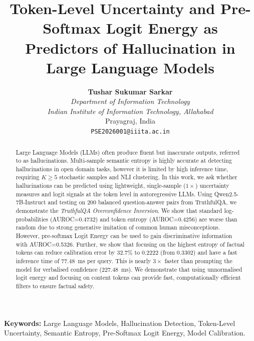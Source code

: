 \documentclass[10pt,twocolumn]{article}
\begin{document}
\title{\textbf{Token-Level Uncertainty and Pre-Softmax Logit Energy as Predictors of Hallucination in Large Language Models}}

\author{\textbf{Tushar Sukumar Sarkar} \\
\textit{Department of Information Technology} \\
\textit{Indian Institute of Information Technology, Allahabad}\\
Prayagraj, India \\
\texttt{PSE2026001@iiita.ac.in}}

\date{}
\maketitle

\begin{abstract}
Large Language Models (LLMs) often produce fluent but inaccurate outputs, referred to as hallucinations. Multi-sample semantic entropy is highly accurate at detecting hallucinations in open domain tasks, however it is limited by high inference time, requiring $K \geq 5$ stochastic samples and NLI clustering. In this work, we ask whether hallucinations can be predicted using lightweight, single-sample ($1\times$) uncertainty measures and logit signals at the token level in autoregressive LLMs. Using Qwen2.5-7B-Instruct and testing on 200 balanced question-answer pairs from TruthfulQA, we demonstrate the \textit{TruthfulQA Overconfidence Inversion}. We show that standard log-probabilities (AUROC=0.4732) and token entropy (AUROC=0.4256) are worse than random due to strong generative imitation of common human misconceptions. However, pre-softmax Logit Energy can be used to gain discriminative information with AUROC=0.5326. Further, we show that focusing on the highest entropy of factual tokens can reduce calibration error by 32.7\% to 0.2222 (from 0.3302) and have a fast inference time of 77.48~ms per query. This is nearly $3\times$ faster than prompting the model for verbalised confidence (227.48~ms). We demonstrate that using unnormalised logit energy and focusing on content tokens can provide fast, computationally efficient filters to ensure factual safety.
\end{abstract}

\vspace{1ex}\noindent\textbf{Keywords: }
Large Language Models, Hallucination Detection, Token-Level Uncertainty, Semantic Entropy, Pre-Softmax Logit Energy, Model Calibration.
\vspace{2ex}
\end{document}
